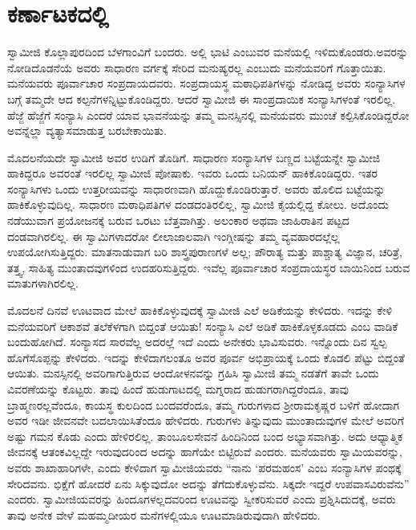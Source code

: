
\chapter{ಕರ್ಣಾಟಕದಲ್ಲಿ }

 ಸ್ವಾಮೀಜಿ ಕೊಲ್ಲಾಪುರದಿಂದ ಬೆಳಗಾಂವಿಗೆ ಬಂದರು. ಅಲ್ಲಿ ಭಾಟಿ ಎಂಬುವರ ಮನೆಯಲ್ಲಿ ಇಳಿದುಕೊಂಡರು.ಅವರನ್ನು ನೋಡಿದೊಡನೆಯೆ ಅವರು ಸಾಧಾರಣ ವರ್ಗಕ್ಕೆ ಸೇರಿದ ಮನುಷ್ಯರಲ್ಲ ಎಂಬುದು ಮನೆಯವರಿಗೆ ಗೊತ್ತಾಯಿತು. ಮನೆಯವರು ಪೂರ್ವಾಚಾರ ಸಂಪ್ರದಾಯದವರು. ಸಂಪ್ರದಾಯಸ್ಥ ಮಠಾಧಿಪತಿಗಳನ್ನು ನೋಡಿದ್ದ ಅವರು ಸಂನ್ಯಾಸಿಗಳ ಬಗ್ಗೆ ತಮ್ಮದೇ ಆದ ಕಲ್ಪನೆಗಳನ್ನಿಟ್ಟುಕೊಂಡಿದ್ದರು. ಆದರೆ ಸ್ವಾಮೀಜಿ ಈ ಸಾಂಪ್ರದಾಯಿಕ ಸಂನ್ಯಾಸಿಗಳಂತೆ ಇರಲಿಲ್ಲ. ಹೆಜ್ಜೆ ಹೆಜ್ಜೆಗೆ ಸಂನ್ಯಾಸಿ ಎಂದರೆ ಯಾವ ಭಾವನೆಯನ್ನು ತಮ್ಮ ಮನಸ್ಸಿನಲ್ಲಿ ಮನೆಯವರು ಮುಂಚೆ ಕಲ್ಪಿಸಿಕೊಂಡಿದ್ದರೋ ಅವನ್ನೆಲ್ಲಾ ವ್ಯತ್ಯಾಸಮಾಡುತ್ತ ಬರಬೇಕಾಯಿತು. 

 ಮೊದಲನೆಯದೇ ಸ್ವಾಮೀಜಿ ಅವರ ಉಡಿಗೆ ತೊಡಿಗೆ. ಸಾಧಾರಣ ಸಂನ್ಯಾಸಿಗಳ ಬಣ್ಣದ ಬಟ್ಟೆಯನ್ನೇ ಸ್ವಾಮೀಜಿ ಹಾಕಿದ್ದರೂ ಅವರಂತೆ ಇರಲಿಲ್ಲ ಸ್ವಾಮೀಜಿ ಪೋಷಾಕು. ಇವರು ಒಂದು ಬನಿಯನ್ ಹಾಕಿಕೊಂಡಿದ್ದರು. ಇತರ ಸಂನ್ಯಾಸಿಗಳು ಒಂದು ಉತ್ತರೀಯವನ್ನು ಸಾಧಾರಣವಾಗಿ ಹೊದ್ದುಕೊಂಡಿರುತ್ತಾರೆ. ಅವರು ಹೊಲಿದ ಬಟ್ಟೆಯನ್ನು ಹಾಕಿಕೊಳ್ಳುವುದಿಲ್ಲ. ಸಾಧಾರಣ ಮಠಾಧಿಪತಿಗಳ ದಂಡದಂತಿರಲಿಲ್ಲ, ಸ್ವಾಮೀಜಿ ಕೈಯಲ್ಲಿದ್ದ ಕೋಲು. ಅದೊಂದು ನಡೆಯುವಾಗ ಪ್ರಯೋಜನಕ್ಕೆ ಬರುವ ಒರಟು ಬೆತ್ತವಾಗಿತ್ತು. ಅಲಂಕಾರ ಅಥವಾ ಜಾಹಿರಾತಿನ ಪಟ್ಟದ ದಂಡವಾಗಿರಲಿಲ್ಲ. ಈ ಸ್ವಾಮಿಗಳಾದರೋ ಲೀಲಾಜಾಲವಾಗಿ ಇಂಗ್ಲೀಷನ್ನು ತಮ್ಮ ವ್ಯವಹಾರದಲ್ಲೆಲ್ಲ ಉಪಯೋಗಿಸುತ್ತಿದ್ದರು. ಮಾತನಾಡುವಾಗ ಬರಿ ಶಾಸ್ತ್ರಪುರಾಣಗಳೆ ಅಲ್ಲ; ಪೌರಾತ್ಯ ಮತ್ತು ಪಾಶ್ಚಾತ್ಯ ವಿಜ್ಞಾನ, ಚರಿತ್ರೆ, ತತ್ತ್ವ, ಸಾಹಿತ್ಯ ಮುಂತಾದವುಗಳಿಂದ ಉದಹರಿಸುತ್ತಿದ್ದರು. ಇವೆಲ್ಲ ಪೂರ್ವಾಚಾರ ಸಂಪ್ರದಾಯಸ್ಥರ ಬಾಯಿನಿಂದ ಬರುವ ಮಾತುಗಳಾಗಿರಲಿಲ್ಲ. 

 ಮೊದಲನೆ ದಿನವೆ ಊಟವಾದ ಮೇಲೆ ಹಾಕಿಕೊಳ್ಳುವುದಕ್ಕೆ ಸ್ವಾಮೀಜಿ ಎಲೆ ಅಡಿಕೆಯನ್ನು ಕೇಳಿದರು. ಇದನ್ನು ಕೇಳಿ ಮನೆಯವರಿಗೆ ಆಕಾಶವೆ ತಲೆಕೆಳಗಾಗಿ ಬಿದ್ದಂತೆ ಆಯಿತು! ಸಂನ್ಯಾಸಿ ಎಲೆ ಅಡಿಕೆ ಹಾಕಿಕೊಳ್ಳಕೂಡದು ಎಂಬ ವಾಡಿಕೆ ಬಂದುಹೋಗಿದೆ. ಸಂನ್ಯಾಸದ ಸಾರವೆಲ್ಲ ಅದರಲ್ಲೆ ಇದೆ ಎಂದು ಅನೇಕರು ಭಾವಿಸುವರು. ಇನ್ನೊಂದು ದಿನ ಸ್ವಲ್ಪ ಹೊಗೆಸೊಪ್ಪನ್ನು ಕೇಳಿದರು. ಇದನ್ನು ಕೇಳಿದಾಗಲಂತೂ ಅವರ ಪೂರ್ವ ಅಭಿಪ್ರಾಯಕ್ಕೆ ಒಂದು ಕೊಡಲಿ ಪೆಟ್ಟು ಬಿದ್ದಂತೆ ಆಯಿತು. ಮನಸ್ಸಿನಲ್ಲಿ ಅವರಿಗಾಗುತ್ತಿರುವ ಆಂದೋಳನವನ್ನು ಗ್ರಹಿಸಿ ಸ್ವಾಮೀಜಿ ತಮ್ಮ ನಡತೆಗೆ ತಾವೇ ಒಂದು ವಿವರಣೆಯನ್ನು ಕೊಟ್ಟರು. ತಾವು ಹಿಂದೆ ಹುಡುಗಾಟದಲ್ಲಿ ಮಗ್ನರಾದ ಹುಡುಗರಾಗಿದ್ದರೆಂದೂ, ತಾವು ಬ್ರಾಹ್ಮಣರಲ್ಲವೆಂದೂ, ಕಾಯಸ್ಥ ಕುಲದಿಂದ ಬಂದವರೆಂದೂ, ತಮ್ಮ ಗುರುಗಳಾದ ಶ‍್ರೀರಾಮಕೃಷ್ಣರ ಬಳಿಗೆ ಹೋದಾಗ ಅವರ ಇಡೀ ಜೀವನವೇ ಬದಲಾಯಿಸಿತೆಂದೂ ಹೇಳಿದರು. ಗುರುಗಳು ತಿನ್ನುವುದು ಮುಂತಾದುವುಗಳ ಮೇಲೆ ಅವರಿಗೆ ಅಷ್ಟು ಗಮನ ಕೊಡು ಎಂದು ಹೇಳಿರಲಿಲ್ಲ. ತಾಂಬೂಲಸೇವನೆ ಹಿಂದಿನಿಂದ ಬಂದ ಅಭ್ಯಾಸವಾಗಿತ್ತು. ಅದು ಆಧ್ಯಾತ್ಮಿಕ ಜೀವನಕ್ಕೆ ಆತಂಕವಿಲ್ಲದ್ದೇ ಇರುವುದರಿಂದ ಅದನ್ನು ಹಾಗೆಯೇ ಬಿಟ್ಟಿರುವೆ ಎಂದರು. ಮನೆಯವರು ಸ್ವಾಮಿಯವರನ್ನು, ಅವರು ಶಾಖಾಹಾರಿಗಳೇ, ಎಂದು ಕೇಳಿದಾಗ ಸ್ವಾಮೀಜಿಯವರು “ನಾನು ‘ಪರಮಹಂಸ’ ಎಂಬ ಸಂನ್ಯಾಸಿಗಳ ಪಂಥಕ್ಕೆ ಸೇರಿದವನು. ಭಿಕ್ಷೆಗೆ ಹೋದರೆ ಏನು ಸಿಕ್ಕುವುದೋ ಅದನ್ನು ತೆಗೆದುಕೊಳ್ಳುವೆನು. ಸಿಕ್ಕದೇ ಇದ್ದರೆ ಉಪವಾಸವಿರುವೆನು” ಎಂದರು. ಸ್ವಾಮೀಜಿಯವರನ್ನು ಹಿಂದೂಗಳಲ್ಲದವರಿಂದ ಊಟವನ್ನು ಸ್ವೀಕರಿಸುವರೆ ಎಂದು ಪ್ರಶ್ನಿಸಿದುದಕ್ಕೆ, ಅವರು ತಾವು ಅನೇಕ ವೇಳೆ ಮಹಮ್ಮದೀಯರ ಮನೆಗಳಲ್ಲಿಯೂ ಊಟಮಾಡಿರುವುದಾಗಿ ಹೇಳಿದರು. 

